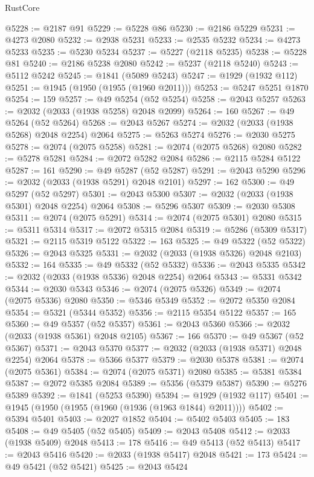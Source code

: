\begin{lexlean}{RustCore}
\begin{coremodule}
@5228 := @2187 @91
@5229 := @5228 @86
@5230 := @2186 @5229
@5231 := @4273 @2080
@5232 := @2938 @5231
@5233 := @2535 @5232
@5234 := @4273 @5233
@5235 := @5230 @5234
@5237 := @5227 (@2118 @5235)
@5238 := @5228 @81
@5240 := @2186 @5238 @2080
@5242 := @5237 (@2118 @5240)
@5243 := @5112 @5242
@5245 := @1841 (@5089 @5243)
@5247 := @1929 (@1932 @112)
@5251 := @1945 (@1950 (@1955 (@1960 @2011)))
@5253 := @5247 @5251 @1870
@5254 := 159
@5257 := @49 @5254 (@52 @5254)
@5258 := @2043 @5257
@5263 := @2032 (@2033 (@1938 @5258) @2048 @2099)
@5264 := 160
@5267 := @49 @5264 (@52 @5264)
@5268 := @2043 @5267
@5274 := @2032 (@2033 (@1938 @5268) @2048 @2254) @2064
@5275 := @5263 @5274
@5276 := @2030 @5275
@5278 := @2074 (@2075 @5258)
@5281 := @2074 (@2075 @5268) @2080
@5282 := @5278 @5281
@5284 := @2072 @5282 @2084
@5286 := @2115 @5284 @5122
@5287 := 161
@5290 := @49 @5287 (@52 @5287)
@5291 := @2043 @5290
@5296 := @2032 (@2033 (@1938 @5291) @2048 @2101)
@5297 := 162
@5300 := @49 @5297 (@52 @5297)
@5301 := @2043 @5300
@5307 := @2032 (@2033 (@1938 @5301) @2048 @2254) @2064
@5308 := @5296 @5307
@5309 := @2030 @5308
@5311 := @2074 (@2075 @5291)
@5314 := @2074 (@2075 @5301) @2080
@5315 := @5311 @5314
@5317 := @2072 @5315 @2084
@5319 := @5286 (@5309 @5317)
@5321 := @2115 @5319 @5122
@5322 := 163
@5325 := @49 @5322 (@52 @5322)
@5326 := @2043 @5325
@5331 := @2032 (@2033 (@1938 @5326) @2048 @2103)
@5332 := 164
@5335 := @49 @5332 (@52 @5332)
@5336 := @2043 @5335
@5342 := @2032 (@2033 (@1938 @5336) @2048 @2254) @2064
@5343 := @5331 @5342
@5344 := @2030 @5343
@5346 := @2074 (@2075 @5326)
@5349 := @2074 (@2075 @5336) @2080
@5350 := @5346 @5349
@5352 := @2072 @5350 @2084
@5354 := @5321 (@5344 @5352)
@5356 := @2115 @5354 @5122
@5357 := 165
@5360 := @49 @5357 (@52 @5357)
@5361 := @2043 @5360
@5366 := @2032 (@2033 (@1938 @5361) @2048 @2105)
@5367 := 166
@5370 := @49 @5367 (@52 @5367)
@5371 := @2043 @5370
@5377 := @2032 (@2033 (@1938 @5371) @2048 @2254) @2064
@5378 := @5366 @5377
@5379 := @2030 @5378
@5381 := @2074 (@2075 @5361)
@5384 := @2074 (@2075 @5371) @2080
@5385 := @5381 @5384
@5387 := @2072 @5385 @2084
@5389 := @5356 (@5379 @5387)
@5390 := @5276 @5389
@5392 := @1841 (@5253 @5390)
@5394 := @1929 (@1932 @117)
@5401 := @1945 (@1950 (@1955 (@1960 (@1936 (@1963 @1844) @2011))))
@5402 := @5394 @5401
@5403 := @2027 @1852
@5404 := @5402 @5403
@5405 := 183
@5408 := @49 @5405 (@52 @5405)
@5409 := @2043 @5408
@5412 := @2033 (@1938 @5409) @2048
@5413 := 178
@5416 := @49 @5413 (@52 @5413)
@5417 := @2043 @5416
@5420 := @2033 (@1938 @5417) @2048
@5421 := 173
@5424 := @49 @5421 (@52 @5421)
@5425 := @2043 @5424

\end{coremodule}
\end{lexlean}
